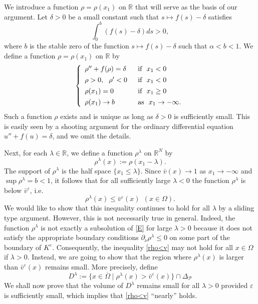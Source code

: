\documentclass[a4paper,12pt,fullpage]{article}
\numberwithin{equation}{section}
\def\R{{\mathbb R}}
\def\ep{\varepsilon}
\begin{document}
We introduce a function $\rho=\rho(x_1)$ on $\R$ that 
will serve as the basis of our argument. Let $\delta>0$ be a small constant such that $s\mapsto f(s)-\delta$ satisfies
\[
\int_0^b \left(f(s)-\delta\right)ds >0,
\]
where $b$ is the stable zero of the function $s\mapsto f(s)-\delta$ such that $\alpha<b<1$. We define a function $\rho=\rho(x_1)$ on $\R$ by
\begin{equation}\label{rho}
\left\{\begin{array}{ll}
\rho''+f(\rho)= \delta\ \ &\hbox{if}\ \ x_1< 0\\[4pt]
\rho>0,\ \ \rho'<0 & \hbox{if}\ \ x_1< 0\\[4pt]
\rho(x_1)=0 \quad & \hbox{if}\ \ x_1\geq 0\\[4pt]
\rho(x_1)\to b & \hbox{as}\ \ x_1\to -\infty.
\end{array}\right.
\end{equation}
Such a function $\rho$ exists and is unique as long as $\delta>0$ is sufficiently small. This is easily seen by a shooting argument for the ordinary differential equation $u''+f(u)=\delta$, and we omit the details.

Next, for each $\lambda\in\R$, we define a function $\rho^\lambda$ on $\R^N$ by 
\[
\rho^\lambda(x):=\rho(x_1-\lambda).
\]
The support of $\rho^\lambda$ is the half space $\{x_1\leq \lambda\}$.  Since $\bar v(x)\to 1$ as $x_1\to-\infty$ and  $\sup \rho^\lambda=b<1$, it follows that for all sufficiently large $\lambda<0$ the function $\rho^\lambda$ is below $\bar{v}^\ep$, i.e.
\begin{equation}\label{rho<v}
\rho^\lambda(x)\leq \bar{v}^\ep(x) \ \ (x\in\Omega).
\end{equation}
We would like to show that this inequality continues to hold for all $\lambda$ by a sliding type argument. However, this is not necessarily true in general. Indeed, the function $\rho^\lambda$ is not exactly a subsolution of \eqref{E} for large $\lambda>0$ because it does not satisfy the appropriate boundary conditions $\partial_\nu\rho^\lambda\leq 0$ on some part of the boundary of $K^\ep$. Consequently, the inequality \eqref{rho<v} may not hold for all $x\in\Omega$ if $\lambda>0$. Instead, we are going to show that the region where $\rho^\lambda(x)$ is larger than $\bar{v}^\ep(x)$ remains small. More precisely, define
\[
D^\lambda:=\{x\in\overline{\Omega}\mid \rho^\lambda(x)>\bar{v}^\ep(x)\}\cap \Delta_{\mathcal P}
\]
We shall now prove that the volume of $D^\lambda$ remains small for all $\lambda>0$ provided $\ep$ is sufficiently small, which implies that \eqref{rho<v} ``nearly'' holds. 
\end{document}
